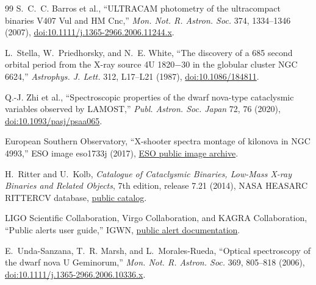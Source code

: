 \documentclass[10pt,onecolumn]{article}
\let\appendixXfinish\relax
\def\appendixXfinish{\end{document}}
\begin{document}
\begin{thebibliography}{99}
S.~C.~C. Barros et al., ``ULTRACAM photometry of the ultracompact binaries
V407 Vul and HM Cnc,'' \emph{Mon. Not. R. Astron. Soc.} 374, 1334--1346
(2007),
\href{https://doi.org/10.1111/j.1365-2966.2006.11244.x}{doi:10.1111/j.1365-2966.2006.11244.x}.

L.~Stella, W.~Priedhorsky, and N.~E. White, ``The discovery of a 685 second
orbital period from the X-ray source 4U 1820$-$30 in the globular cluster
NGC 6624,'' \emph{Astrophys. J. Lett.} 312, L17--L21 (1987),
\href{https://doi.org/10.1086/184811}{doi:10.1086/184811}.

Q.-J. Zhi et al., ``Spectroscopic properties of the dwarf nova-type
cataclysmic variables observed by LAMOST,'' \emph{Publ. Astron. Soc. Japan}
72, 76 (2020),
\href{https://doi.org/10.1093/pasj/psaa065}{doi:10.1093/pasj/psaa065}.

European Southern Observatory, ``X-shooter spectra montage of kilonova in
NGC 4993,'' ESO image eso1733j (2017),
\href{https://www.eso.org/public/images/eso1733j/}{ESO public image archive}.

H.~Ritter and U.~Kolb, \emph{Catalogue of Cataclysmic Binaries, Low-Mass
X-ray Binaries and Related Objects}, 7th edition, release 7.21 (2014),
NASA HEASARC RITTERCV database,
\href{https://heasarc.gsfc.nasa.gov/w3browse/all/rittercv.html}{public catalog}.

LIGO Scientific Collaboration, Virgo Collaboration, and KAGRA Collaboration,
``Public alerts user guide,'' IGWN,
\href{https://emfollow.docs.ligo.org/userguide/}{public alert documentation}.

E.~Unda-Sanzana, T.~R. Marsh, and L.~Morales-Rueda, ``Optical spectroscopy
of the dwarf nova U Geminorum,'' \emph{Mon. Not. R. Astron. Soc.} 369,
805--818 (2006),
\href{https://doi.org/10.1111/j.1365-2966.2006.10336.x}{doi:10.1111/j.1365-2966.2006.10336.x}.

\end{thebibliography}

\appendixXfinish
\end{document}
